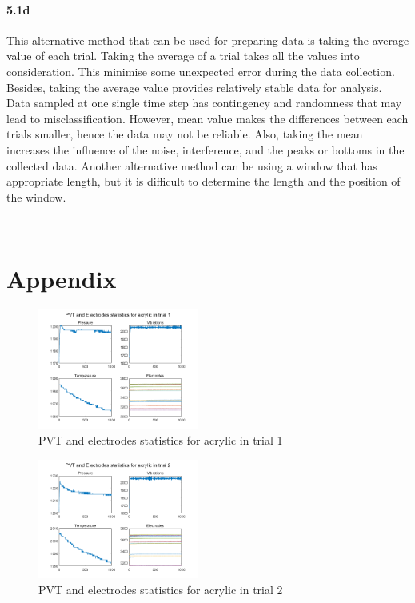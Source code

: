 \documentclass[10pt,twocolumn,letterpaper]{article}
\begin{document}
\paragraph{5.1d}
This alternative method that can be used for preparing data is taking the average value of each trial. Taking the average of a trial takes all the values into consideration. This minimise some unexpected error during the data collection. Besides, taking the average value provides relatively stable data for analysis. Data sampled at one single time step has contingency and randomness that may lead to misclassification. However, mean value makes the differences between each trials smaller, hence the data may not be reliable. Also, taking the mean increases the influence of the noise, interference, and the peaks or bottoms in the collected data. Another alternative method can be using a window that has appropriate length, but it is difficult to determine the length and the position of the window.




\clearpage

{\small



}
~\\

\section*{Appendix}




\begin{figure}[h]
\begin{center}
   \includegraphics[width=0.47\textwidth]{part1_1}
\end{center}
   \caption{PVT and electrodes statistics for acrylic in trial 1}
\label{fig:1}
\end{figure}

\begin{figure}[h]
\begin{center}
   \includegraphics[width=0.47\textwidth]{part1_2}
\end{center}
   \caption{PVT and electrodes statistics for acrylic in trial 2}
\label{fig:2}
\end{figure}
\end{document}
